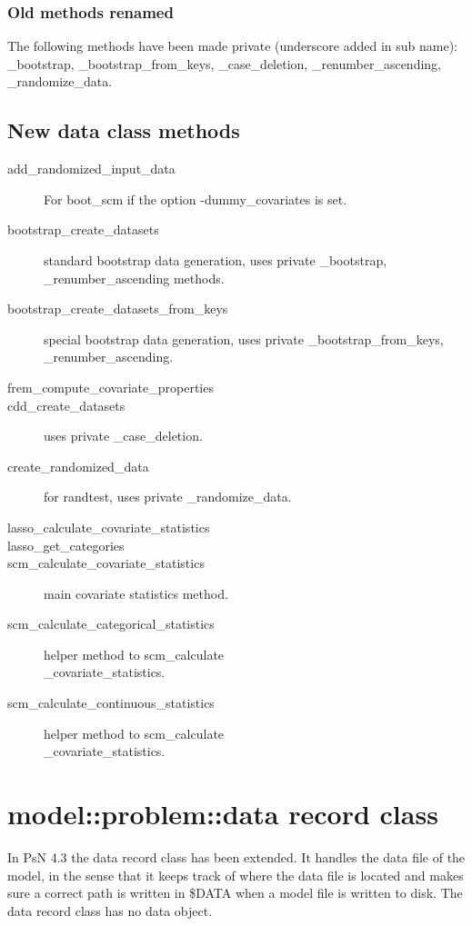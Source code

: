 \subsubsection{Old methods renamed}
The following methods have been made private (underscore added in sub name):\\
\_bootstrap, \_bootstrap\_from\_keys, \_case\_deletion, \_renumber\_ascending, \\\_randomize\_data.

\subsection{New data class methods}
\begin{description}
\item[add\_randomized\_input\_data] For boot\_scm if the option -dummy\_covariates is set.
\item[bootstrap\_create\_datasets] standard bootstrap data generation, uses private \_bootstrap, \_renumber\_ascending methods.
\item[bootstrap\_create\_datasets\_from\_keys] special bootstrap data generation, uses private \_bootstrap\_from\_keys, \_renumber\_ascending.
\item[frem\_compute\_covariate\_properties]
\item[cdd\_create\_datasets] uses private \_case\_deletion.
\item[create\_randomized\_data] for randtest, uses private \_randomize\_data.
\item[lasso\_calculate\_covariate\_statistics]
\item[lasso\_get\_categories]
\item[scm\_calculate\_covariate\_statistics] main covariate statistics method.
\item[scm\_calculate\_categorical\_statistics] helper method to scm\_calculate\\ \_covariate\_statistics.
\item[scm\_calculate\_continuous\_statistics] helper method to scm\_calculate\\ \_covariate\_statistics.
\end{description}
\section{model::problem::data record class}
In PsN 4.3 the data record class has been extended. It handles the data file of the model, in the sense that it keeps track
of where the data file is located and makes sure a correct path is written in \$DATA when a model file
is written to disk. The data record class has no data object.

